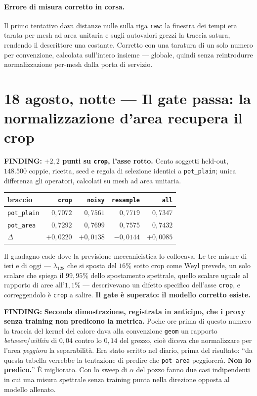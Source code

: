 \documentclass[11pt,a4paper]{article}
\newcommand{\finding}[1]{\textcolor{finding}{\textbf{FINDING:}} #1}
\begin{document}
\paragraph{Errore di misura corretto in corsa.} Il primo tentativo dava distanze nulle sulla riga
\texttt{raw}: la finestra dei tempi era tarata per mesh ad area unitaria e sugli autovalori
grezzi la traccia satura, rendendo il descrittore una costante. Corretto con una taratura di un
solo numero per convenzione, calcolata sull'intero insieme --- globale, quindi senza reintrodurre
normalizzazione per-mesh dalla porta di servizio.


\section{18 agosto, notte --- Il gate passa: la normalizzazione d'area recupera il crop}

\finding{\textbf{$+2{,}2$ punti su \texttt{crop}, l'asse rotto.} Cento soggetti held-out,
$148{.}500$ coppie, ricetta, seed e regola di selezione identici a \texttt{pot\_plain}; unica
differenza gli operatori, calcolati su mesh ad area unitaria.}

\begin{center}\small
\begin{tabular}{lrrrr}
\toprule
braccio & \texttt{crop} & \texttt{noisy} & \texttt{resample} & \texttt{all} \\
\midrule
\texttt{pot\_plain} & $0{,}7072$ & $0{,}7561$ & $0{,}7719$ & $0{,}7347$ \\
\texttt{pot\_area}  & $0{,}7292$ & $0{,}7699$ & $0{,}7575$ & $0{,}7432$ \\
\midrule
$\Delta$            & $+0{,}0220$ & $+0{,}0138$ & $-0{,}0144$ & $+0{,}0085$ \\
\bottomrule
\end{tabular}
\end{center}

Il guadagno cade dove la previsione meccanicistica lo collocava. Le tre misure di ieri e di oggi
--- $\lambda_{128}$ che si sposta del $16\%$ sotto crop come Weyl prevede, un solo scalare che
spiega il $99{,}95\%$ dello spostamento spettrale, quello scalare uguale al rapporto di aree
all'$1{,}1\%$ --- descrivevano un difetto specifico dell'asse \texttt{crop}, e correggendolo
\`e \texttt{crop} a salire. \textbf{Il gate \`e superato: il modello corretto esiste.}

\finding{\textbf{Seconda dimostrazione, registrata in anticipo, che i proxy senza training non
predicono la metrica.} Poche ore prima di questo numero la traccia del kernel del calore dava
alla convenzione \texttt{geom} un rapporto \emph{between}/\emph{within} di $0{,}04$ contro lo
$0{,}14$ del grezzo, cio\`e diceva che normalizzare per l'area \emph{peggiora} la separabilit\`a.
Era stato scritto nel diario, prima del risultato: ``da questa tabella verrebbe la tentazione di
predire che \texttt{pot\_area} peggiorer\`a. \textbf{Non lo predico.}'' \`E migliorato. Con lo
sweep di $\alpha$ del pozzo fanno due casi indipendenti in cui una misura spettrale senza
training punta nella direzione opposta al modello allenato.}
\end{document}
